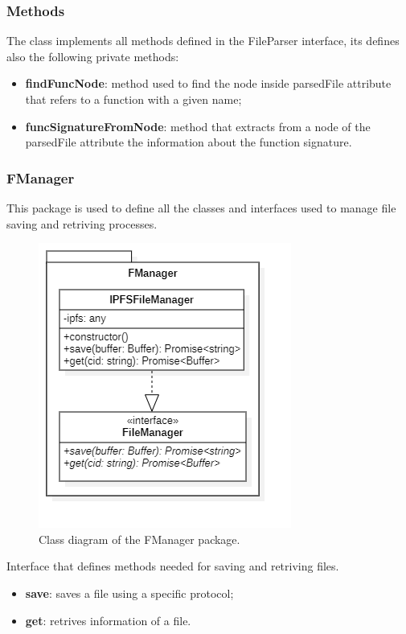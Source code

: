 				\subsubsection*{Methods}
				The class implements all methods defined in the FileParser interface, its defines also the following private methods: 
				\begin{itemize}
					\item \textbf{findFuncNode}: method used to find the node inside parsedFile attribute that refers to a function with a given name; 
					\item \textbf{funcSignatureFromNode}: method that extracts from a node of the parsedFile attribute the information about the function signature. 
				\end{itemize}
			
		\subsubsection{FManager} 			
		This package is used to define all the classes and interfaces used to manage file saving and retriving processes.
		\begin{figure} [h!]
			\centering
			\includegraphics[width=0.5\linewidth]{diagrammi/etherless-cli/FManager}
			\caption{Class diagram of the FManager package.}
		\end{figure}	
				
			Interface that defines methods needed for saving and retriving files. 
		
					\begin{itemize}
						\item \textbf{save}: saves a file using a specific protocol;
						\item \textbf{get}: retrives information of a file.
				\end{itemize}
			
